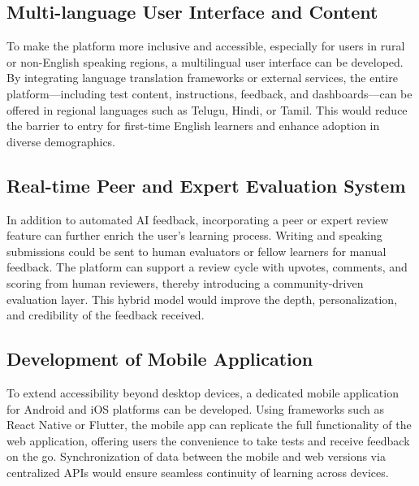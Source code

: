 \documentclass[a4paper,12pt]{article}
\begin{document}
\vspace{0.5cm}

\subsection{Multi-language User Interface and Content}

To make the platform more inclusive and accessible, especially for users in rural or non-English speaking regions, a multilingual user interface can be developed. By integrating language translation frameworks or external services, the entire platform—including test content, instructions, feedback, and dashboards—can be offered in regional languages such as Telugu, Hindi, or Tamil. This would reduce the barrier to entry for first-time English learners and enhance adoption in diverse demographics.

\vspace{0.5cm}

\subsection{Real-time Peer and Expert Evaluation System}

In addition to automated AI feedback, incorporating a peer or expert review feature can further enrich the user’s learning process. Writing and speaking submissions could be sent to human evaluators or fellow learners for manual feedback. The platform can support a review cycle with upvotes, comments, and scoring from human reviewers, thereby introducing a community-driven evaluation layer. This hybrid model would improve the depth, personalization, and credibility of the feedback received.

\vspace{0.5cm}

\subsection{Development of Mobile Application}

To extend accessibility beyond desktop devices, a dedicated mobile application for Android and iOS platforms can be developed. Using frameworks such as React Native or Flutter, the mobile app can replicate the full functionality of the web application, offering users the convenience to take tests and receive feedback on the go. Synchronization of data between the mobile and web versions via centralized APIs would ensure seamless continuity of learning across devices.
\end{document}
